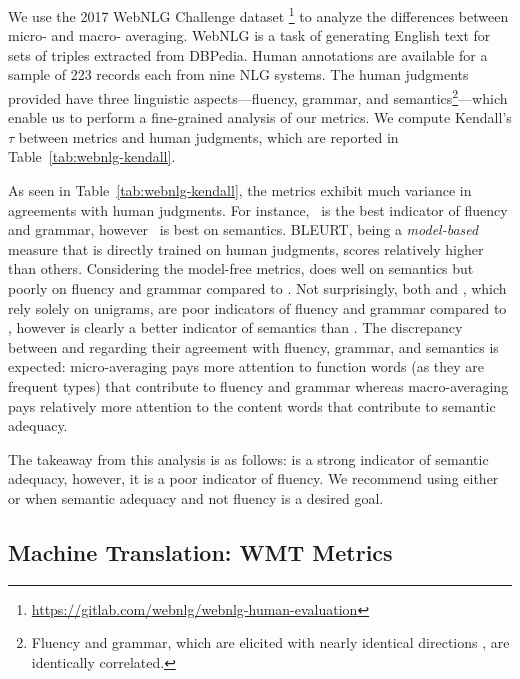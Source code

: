 We use the 2017 WebNLG Challenge dataset \cite{gardent2017webNLG-corpus, shimorina2018webnlg-human-eval}\footnote{\url{https://gitlab.com/webnlg/webnlg-human-evaluation}} to analyze the differences between micro- and macro- averaging. 
WebNLG is a task of generating English text for sets of triples extracted from DBPedia.
Human annotations are available for a sample of 223 records each from nine NLG systems.
The human judgments provided have three linguistic aspects---fluency, grammar, and semantics\footnote{Fluency and grammar, which are elicited with nearly identical directions \cite{gardent2017webNLG-corpus}, are identically correlated.}---which enable us to perform a fine-grained analysis of our metrics.
We compute Kendall's $\tau$ between metrics and human judgments, which are reported in Table~\ref{tab:webnlg-kendall}.

As seen in Table~\ref{tab:webnlg-kendall}, the metrics exhibit much variance in agreements with human judgments. %
For instance, \blrtmd\ is the best indicator of fluency and grammar, however \blrtmn\ is best on semantics. 
BLEURT, being a \textit{model-based} measure that is directly trained on human judgments, scores relatively higher than others.
Considering the model-free metrics,  does well on semantics but poorly on fluency and grammar compared to \bleu.
Not surprisingly, both  and , which rely solely on unigrams, are poor indicators of fluency and grammar compared to \bleu, however  is clearly a better indicator of semantics than \bleu. 
The discrepancy between  and  regarding their agreement with fluency, grammar, and semantics is expected: micro-averaging pays more attention to function words (as they are frequent types) that contribute to fluency and grammar whereas macro-averaging pays relatively more attention to the content words that contribute to semantic adequacy. 

The takeaway from this analysis is as follows:  is a strong indicator of semantic adequacy, however, it is a poor indicator of fluency. We recommend using either  or  when semantic adequacy and not fluency is a desired goal.

\subsection{Machine Translation: WMT Metrics}
\label{sec:wmt-metrics}

